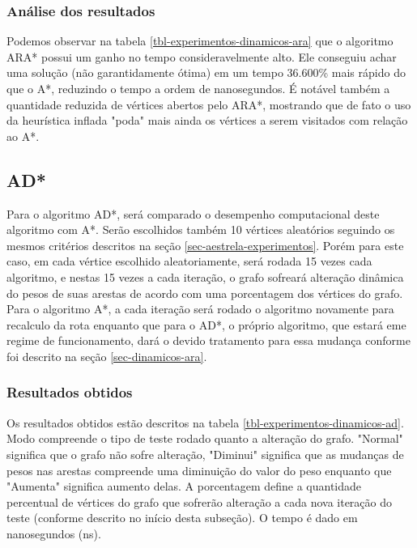 \subsubsection{Análise dos resultados}
\label{sec-experimentos-dinamicos-ara-analise}

Podemos observar na tabela \ref{tbl-experimentos-dinamicos-ara} que o algoritmo ARA* possui um ganho no tempo consideravelmente alto. Ele conseguiu achar uma solução (não garantidamente ótima) em um tempo 36.600\% mais rápido do que o A*, reduzindo o tempo a ordem de nanosegundos. É notável também a quantidade reduzida de vértices abertos pelo ARA*, mostrando que de fato o uso da heurística inflada "poda" mais ainda os vértices a serem visitados com relação ao A*.

\subsection{AD*}
\label{sec-experimentos-dinamicos-ad}

Para o algoritmo AD*, será comparado o desempenho computacional deste algoritmo com A*. Serão escolhidos também 10 vértices aleatórios seguindo os mesmos critérios descritos na seção \ref{sec-aestrela-experimentos}. Porém para este caso, em cada vértice escolhido aleatoriamente, será rodada 15 vezes cada algoritmo, e nestas 15 vezes a cada iteração, o grafo sofreará alteração dinâmica do pesos de suas arestas de acordo com uma porcentagem dos vértices do grafo. Para o algoritmo A*, a cada iteração será rodado o algoritmo novamente para recalculo da rota enquanto que para o AD*, o próprio algoritmo, que estará eme regime de funcionamento, dará o devido tratamento para essa mudança conforme foi descrito na seção \ref{sec-dinamicos-ara}.

\subsubsection{Resultados obtidos}
\label{sec-experimentos-dinamicos-ad-resultados}

Os resultados obtidos estão descritos na tabela \ref{tbl-experimentos-dinamicos-ad}. Modo compreende o tipo de teste rodado quanto a alteração do grafo. "Normal" significa que o grafo não sofre alteração, "Diminui" significa que as mudanças de pesos nas arestas compreende uma diminuição do valor do peso enquanto que "Aumenta" significa aumento delas. A porcentagem define a quantidade percentual de vértices do grafo que sofrerão alteração a cada nova iteração do teste (conforme descrito no início desta subseção). O tempo é dado em nanosegundos (ns).

